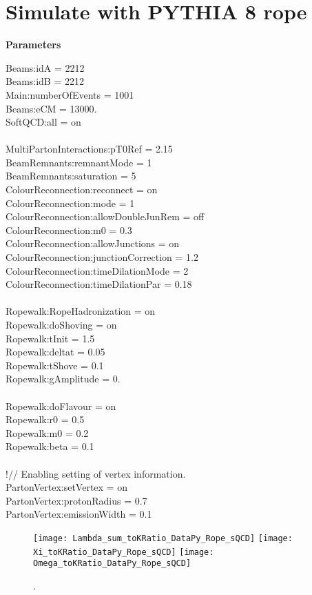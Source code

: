 
\section{Simulate with PYTHIA 8 rope}%
\label{sec:rope}
\textbf{Parameters}

Beams:idA = 2212
\\Beams:idB = 2212
\\Main:numberOfEvents = 1001
\\Beams:eCM = 13000.
\\SoftQCD:all = on
\\
\\MultiPartonInteractions:pT0Ref = 2.15
\\BeamRemnants:remnantMode = 1
\\BeamRemnants:saturation = 5
\\ColourReconnection:reconnect = on
\\ColourReconnection:mode = 1
\\ColourReconnection:allowDoubleJunRem = off
\\ColourReconnection:m0 = 0.3
\\ColourReconnection:allowJunctions = on
\\ColourReconnection:junctionCorrection = 1.2
\\ColourReconnection:timeDilationMode = 2
\\ColourReconnection:timeDilationPar = 0.18
\\
\\Ropewalk:RopeHadronization = on
\\Ropewalk:doShoving = on
\\Ropewalk:tInit = 1.5 %
\\Ropewalk:deltat = 0.05
\\Ropewalk:tShove = 0.1
\\Ropewalk:gAmplitude = 0. %
\\
\\Ropewalk:doFlavour = on
\\Ropewalk:r0 = 0.5
\\Ropewalk:m0 = 0.2
\\Ropewalk:beta = 0.1
\\
\\!// Enabling setting of vertex information.
\\PartonVertex:setVertex = on
\\PartonVertex:protonRadius = 0.7
\\PartonVertex:emissionWidth = 0.1

\begin{figure}[ht]
	\begin{center}
		\texttt{[image: Lambda\_sum\_toKRatio\_DataPy\_Rope\_sQCD]}
		\texttt{[image: Xi\_toKRatio\_DataPy\_Rope\_sQCD]}
		\texttt{[image: Omega\_toKRatio\_DataPy\_Rope\_sQCD]}
	\end{center}
	\caption{.}
	\label{fig:SMParticle}
\end{figure}
